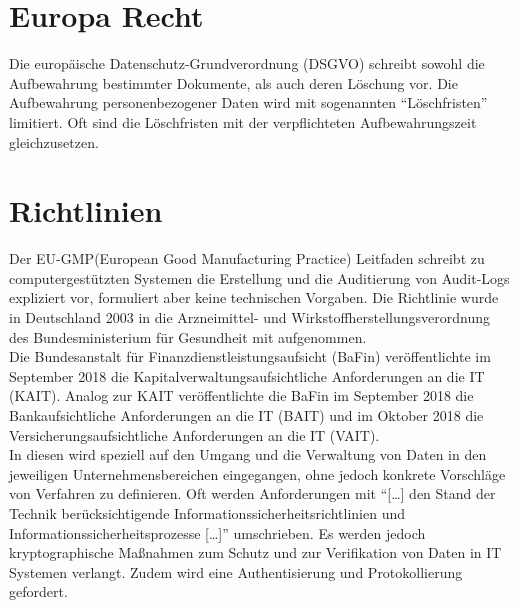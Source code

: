 \section{Europa Recht}
Die europäische Datenschutz-Grundverordnung (\acs{DSGVO}) schreibt sowohl die Aufbewahrung bestimmter Dokumente, als auch deren Löschung vor. Die Aufbewahrung personenbezogener Daten wird mit sogenannten "`Löschfristen"' limitiert. Oft sind die Löschfristen mit der verpflichteten Aufbewahrungszeit gleichzusetzen.\cite{15}\\

\section{Richtlinien}

Der \acs{EU-GMP}(European Good Manufacturing Practice) Leitfaden schreibt zu computergestützten Systemen die Erstellung und die Auditierung von Audit-Logs expliziert vor, formuliert aber keine technischen Vorgaben.\cite{20} Die Richtlinie wurde in Deutschland 2003 in die Arzneimittel- und Wirkstoffherstellungsverordnung des  Bundesministerium für Gesundheit mit aufgenommen. \cite{19}\\

Die Bundesanstalt für Finanzdienstleistungsaufsicht (\acs{BaFin}) veröffentlichte im September 2018 die Kapitalverwaltungsaufsichtliche Anforderungen an die IT (\acs{KAIT}). Analog zur \acs{KAIT} veröffentlichte die \acs{BaFin} im September 2018 die Bankaufsichtliche Anforderungen an die IT (\acs{BAIT}) und im Oktober 2018 die Versicherungsaufsichtliche Anforderungen an die IT (\acs{VAIT}).\\
In diesen wird speziell auf den Umgang und die Verwaltung von Daten in den jeweiligen Unternehmensbereichen eingegangen, ohne jedoch konkrete Vorschläge von Verfahren zu definieren. Oft werden Anforderungen mit 
"`[\ldots] den Stand der Technik berücksichtigende Informationssicherheitsrichtlinien und Informationssicherheitsprozesse [\ldots]"' \cite{161} umschrieben. Es werden jedoch kryptographische Maßnahmen zum Schutz und zur Verifikation von Daten in \acs{IT} Systemen verlangt. Zudem wird eine Authentisierung und Protokollierung gefordert.\cite{16}\cite{17}\cite{18}


